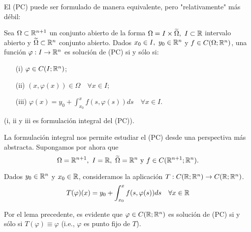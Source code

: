 \documentclass[a4paper]{report}
\begin{document}
		\noindent El (PC) puede ser formulado de manera equivalente, pero "relativamente" más débil:

		\begin{lemma}
			Sea $\Omega \subset \mathbb{R}^{n+1}$ un conjunto abierto de la forma $\Omega = I \times \widetilde{\Omega},\ I \subset \mathbb{R}$ intervalo abierto y $\widetilde{\Omega} \subset \mathbb{R}^n$ conjunto abierto. Dados $x_0 \in I,\ y_0 \in \mathbb{R}^n$ y $f \in C(\Omega;\mathbb{R}^n)$, una función $\varphi : I \to \mathbb{R}^n$ es solución de (PC) si y sólo si:
			\begin{enumerate}
				\item[(i)] $\varphi \in C(I;\mathbb{R}^n)$;

				\item[(ii)] $(x,\varphi(x)) \in \Omega \quad \forall x \in I$;

				\item[(iii)] $\varphi (x) = y_0 + \int_{x_0}^{x} f(s,\varphi(s)) ds \quad \forall x \in I$.
			\end{enumerate}
			(i, ii y iii es formulación integral del (PC)).
		\end{lemma}

		\begin{remark}
			La formulación integral nos permite estudiar el (PC) desde una perspectiva más abstracta. Supongamos por ahora que
			\[ \Omega = \mathbb{R}^{n+1},\ I = \mathbb{R},\ \widetilde{\Omega} = \mathbb{R}^n \text{ y } f \in C(\mathbb{R}^{n+1};\mathbb{R}^n). \]
		\end{remark}

		\noindent Dados $y_0 \in \mathbb{R}^n$ y $x_0 \in \mathbb{R}$, consideramos la aplicación $T: C(\mathbb{R};\mathbb{R}^n) \to C(\mathbb{R};\mathbb{R}^n)$.
		\[ T(\varphi)(x) = y_0 + \int_{x_0}^{x} f(s,\varphi(s)) ds \quad \forall x \in \mathbb{R} \]
		
		\noindent Por el lema precedente, es evidente que $\varphi \in C(\mathbb{R};\mathbb{R}^n)$ es solución de (PC) si y sólo si $T(\varphi) \equiv \varphi$ (i.e., $\varphi$ es punto fijo de $T$).










\end{document}
